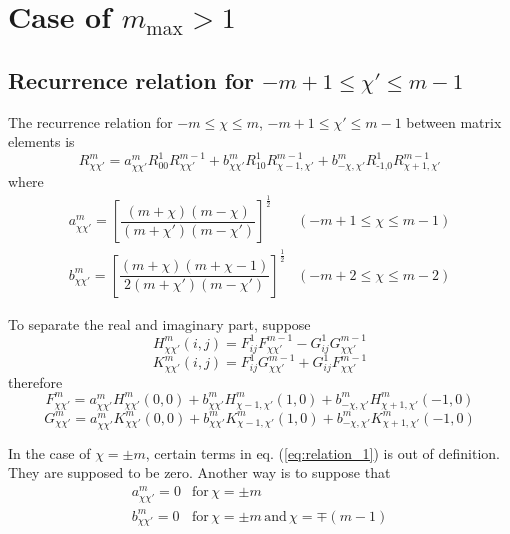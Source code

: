 \section{Case of $m_{\mathrm{max}}>1$}


\subsection{Recurrence relation for $-m+1\leq\chi'\leq m-1$}

The recurrence relation for $-m\leq\chi\leq m$, $-m+1\leq\chi'\leq m-1$
between matrix elements is
\begin{equation}
R_{\chi\chi'}^{m}=a_{\chi\chi'}^{m}R_{00}^{1}R_{\chi\chi'}^{m-1}+b_{\chi\chi'}^{m}R_{10}^{1}R_{\chi-1,\chi'}^{m-1}+b_{-\chi,\chi'}^{m}R_{\text{-1,}0}^{1}R_{\chi+1,\chi'}^{m-1}\label{eq:relation_1}
\end{equation}
where
\begin{equation}
\begin{array}{ll}
a_{\chi\chi'}^{m}=\left[\dfrac{\left(m+\chi\right)\left(m-\chi\right)}{\left(m+\chi'\right)\left(m-\chi'\right)}\right]^{\frac{1}{2}} & (-m+1\leq\chi\leq m-1)\\
b_{\chi\chi'}^{m}=\left[\dfrac{\left(m+\chi\right)\left(m+\chi-1\right)}{2\left(m+\chi'\right)\left(m-\chi'\right)}\right]^{\frac{1}{2}} & (-m+2\leq\chi\leq m-2)
\end{array}
\end{equation}


To separate the real and imaginary part, suppose
\begin{equation}
H_{\chi\chi'}^{m}(i,j)=F_{ij}^{1}F_{\chi\chi'}^{m-1}-G_{ij}^{1}G_{\chi\chi'}^{m-1}
\end{equation}
\begin{equation}
K_{\chi\chi'}^{m}(i,j)=F_{ij}^{1}G_{\chi\chi'}^{m-1}+G_{ij}^{1}F_{\chi\chi'}^{m-1}
\end{equation}
therefore
\begin{equation}
F_{\chi\chi'}^{m}=a_{\chi\chi'}^{m}H_{\chi\chi'}^{m}(0,0)+b_{\chi\chi'}^{m}H_{\chi-1,\chi'}^{m}(1,0)+b_{-\chi,\chi'}^{m}H_{\chi+1,\chi'}^{m}(-1,0)
\end{equation}
\begin{equation}
G_{\chi\chi'}^{m}=a_{\chi\chi'}^{m}K_{\chi\chi'}^{m}(0,0)+b_{\chi\chi'}^{m}K_{\chi-1,\chi'}^{m}(1,0)+b_{-\chi,\chi'}^{m}K_{\chi+1,\chi'}^{m}(-1,0)
\end{equation}


In the case of $\chi=\pm m$, certain terms in eq. (\ref{eq:relation_1})
is out of definition. They are supposed to be zero. Another way is
to suppose that
\begin{equation}
\begin{array}{ll}
a_{\chi\chi'}^{m}=0 & \mathrm{for}\,\chi=\pm m\\
b_{\chi\chi'}^{m}=0 & \mathrm{for}\,\chi=\pm m\,\mathrm{and}\,\chi=\mp(m-1)
\end{array}
\end{equation}



